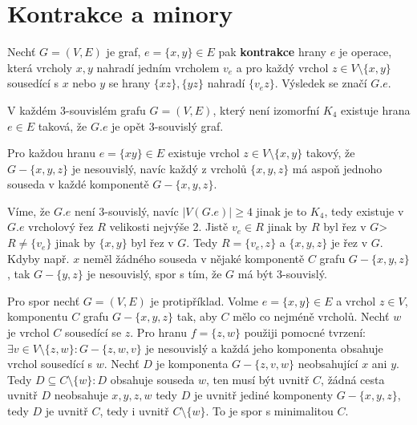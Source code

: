\chapter{Kontrakce a minory}

\begin{definice}
	Nechť $G = (V,E)$ je graf, $e = \{x,y\} \in E$ pak \textbf{kontrakce} hrany $e$ je operace, která vrcholy $x,y$ nahradí jedním vrcholem $v_{e}$ a pro každý vrchol $z \in V \setminus \{x,y\}$ sousedící s $x$ nebo $y$ se hrany $\{xz\},\{yz\}$ nahradí $\{v_{e}z\}$. Výsledek se značí $G.e$.
\end{definice}

\begin{lemma}
	V každém 3-souvislém grafu $G = (V,E)$, který není izomorfní $K_{4}$ existuje hrana $e \in E$ taková, že $G.e$ je opět 3-souvislý graf.
\end{lemma}

\begin{tvrz}
	Pro každou hranu $e = \{xy\} \in E$ existuje vrchol $z \in V \setminus \{x,y\}$ takový, že $G - \{x,y,z\}$ je nesouvislý, navíc každý z vrcholů $\{x,y,z\}$ má aspoň jednoho souseda v každé komponentě $G-\{x,y,z\}$.
\end{tvrz}

\begin{dukaz}
	Víme, že $G.e$ není 3-souvislý, navíc $|V(G.e)| \geq 4$ jinak je to $K_{4}$, tedy existuje v $G.e$ vrcholový řez $R$ velikosti nejvýše 2. Jistě $v_{e} \in R$ jinak by $R$ byl řez v $G$> $R \neq \{v_{e}\}$ jinak by $\{x,y\}$ byl řez v $G$. Tedy $R = \{v_{e},z\}$ a $\{x,y,z\}$ je řez v $G$. Kdyby např. $x$ neměl žádného souseda v nějaké komponentě $C$ grafu $G - \{x,y,z\}$, tak $G - \{y,z\}$ je nesouvislý, spor s tím, že $G$ má být 3-souvislý.
\end{dukaz}

\begin{dukaz}
	Pro spor nechť $G = (V,E)$ je protipříklad. Volme $e = \{x,y\} \in E$ a vrchol $z \in V$, komponentu $C$ grafu $G - \{x,y,z\}$ tak, aby $C$ mělo co nejméně vrcholů. Nechť $w$ je vrchol $C$ sousedící se $z$. Pro hranu $f = \{z,w\}$ použiji pomocné tvrzení: $\exists v \in V \setminus \{z,w\}: G -\{z,w,v\}$ je nesouvislý a každá jeho komponenta obsahuje vrchol sousedící s $w$. Nechť $D$ je komponenta $G - \{z,v,w\}$ neobsahující $x$ ani $y$. Tedy $D \subseteq C \setminus \{w\}: D$ obsahuje souseda $w$, ten musí být uvnitř $C$, žádná cesta uvnitř $D$ neobsahuje $x,y,z,w$ tedy $D$ je uvnitř jediné komponenty $G -\{x,y,z\}$, tedy $D$ je uvnitř $C$, tedy i uvnitř $C \setminus \{w\}$. To je spor s minimalitou $C$.
\end{dukaz}

